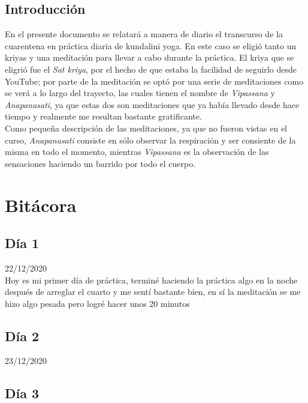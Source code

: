 \documentclass[11pt]{report}
\theoremstyle{plain}
\theoremstyle{definition}
\begin{document}

\tableofcontents


\section{Introducción}

En el presente documento se relatará a manera de diario el transcurso de la cuarentena en práctica diaria de kundalini yoga. En este caso se eligió tanto un kriyas y una meditación para llevar a cabo durante la práctica. El kriya que se eligrió fue el \textit{Sat kriya}, por el hecho de que estaba la facilidad de seguirlo desde YouTube; por parte de la meditación se optó por una serie de meditaciones como se verá a lo largo del trayecto, las cuales tienen el nombre de \textit{Vipassana} y \textit{Anapanasati}, ya que estas dos son meditaciones que ya había llevado desde hace tiempo y realmente me resultan bastante gratificante.\\
Como pequeña descripción de las meditaciones, ya que no fueron vistas en el curso, \textit{Anapanasati} consiste en sólo observar la respiración y ser consiente de la misma en todo el momento, mientras \textit{Vipassana} es la observación de las sensaciones haciendo un barrido por todo el cuerpo.


\chapter{Bitácora}

\section{Día 1}
	22/12/2020\\
	Hoy es mi primer día de práctica, terminé haciendo la práctica algo en la noche después de arreglar el cuarto y me sentí bastante bien, en sí la meditación se me hizo algo pesada pero logré hacer unos 20 minutos
	
\section{Día 2}
	23/12/2020\\
\section{Día 3}
\end{document}
